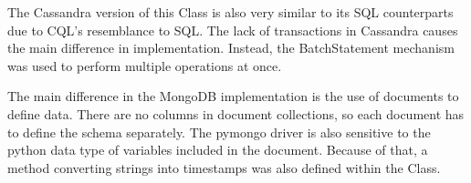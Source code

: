 
\par The Cassandra version of this Class is also very similar to its SQL counterparts due to CQL's resemblance to SQL. The lack of transactions in Cassandra causes the main difference in implementation. Instead, the BatchStatement mechanism was used to perform multiple operations at once.

\par The main difference in the MongoDB implementation is the use of documents to define data. There are no columns in document collections, so each document has to define the schema separately. The pymongo driver is also sensitive to the python data type of variables included in the document. Because of that, a method converting strings into timestamps was also defined within the Class.
